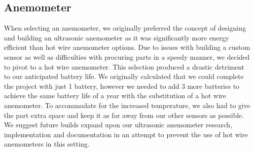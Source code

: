\subsection{Anemometer}
When selecting an anemometer, we originally preferred the concept of designing and building an ultrasonic anemometer as it was significantly more energy efficient than hot wire anemometer options. Due to issues with building a custom sensor as well as difficulties with procuring parts in a speedy manner, we decided to pivot to a hot wire anemometer. This selection produced a drastic detriment to our anticipated battery life. We originally calculated that we could complete the project with just 1 battery, however we needed to add 3 more batteries to achieve the same battery life of a year with the substitution of a hot wire anemometer. To accommodate for the increased temperature, we also had to give the part extra space and keep it as far away from our other sensors as possible. We suggest future builds expand upon our ultrasonic anemometer research, implementation and documentation in an attempt to prevent the use of hot wire anemometers in this setting. \\
\begin{table}[h]
\centering
{}
\caption{Anemometer Sensor Finalists}
\label{tab:Anemometer Sensor Finalists}
\end{table}
